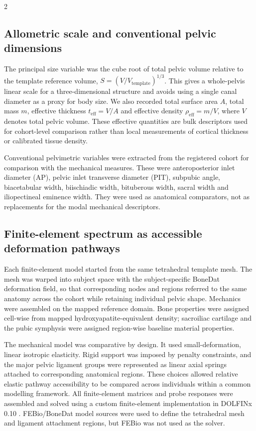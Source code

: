\documentclass[openacc]{rsproca_new}
\begin{document}
\begin{multicols}{2}
\subsection{Allometric scale and conventional pelvic dimensions}

The principal size variable was the cube root of total pelvic volume relative to the template reference volume, $S=(V/V_{\mathrm{template}})^{1/3}$. This gives a whole-pelvis linear scale for a three-dimensional structure and avoids using a single canal diameter as a proxy for body size. We also recorded total surface area $A$, total mass $m$, effective thickness $t_{\mathrm{eff}}=V/A$ and effective density $\rho_{\mathrm{eff}}=m/V$, where $V$ denotes total pelvic volume. These effective quantities are bulk descriptors used for cohort-level comparison rather than local measurements of cortical thickness or calibrated tissue density.

Conventional pelvimetric variables were extracted from the registered cohort for comparison with the mechanical measures. These were anteroposterior inlet diameter (AP), pelvic inlet transverse diameter (PIT), subpubic angle, biacetabular width, biischiadic width, bituberous width, sacral width and iliopectineal eminence width. They were used as anatomical comparators, not as replacements for the modal mechanical descriptors.

\subsection{Finite-element spectrum as accessible deformation pathways}

Each finite-element model started from the same tetrahedral template mesh. The mesh was warped into subject space with the subject-specific BoneDat deformation field, so that corresponding nodes and regions referred to the same anatomy across the cohort while retaining individual pelvic shape. Mechanics were assembled on the mapped reference domain. Bone properties were assigned cell-wise from mapped hydroxyapatite-equivalent density; sacroiliac cartilage and the pubic symphysis were assigned region-wise baseline material properties.

The mechanical model was comparative by design. It used small-deformation, linear isotropic elasticity. Rigid support was imposed by penalty constraints, and the major pelvic ligament groups were represented as linear axial springs attached to corresponding anatomical regions. These choices allowed relative elastic pathway accessibility to be compared across individuals within a common modelling framework. All finite-element matrices and probe responses were assembled and solved using a custom finite-element implementation in DOLFINx 0.10 \cite{Baratta2023DOLFINx}. FEBio/BoneDat model sources were used to define the tetrahedral mesh and ligament attachment regions, but FEBio was not used as the solver.


\end{multicols}
\end{document}
